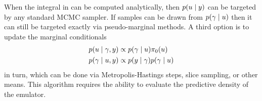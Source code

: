 \documentclass[12pt]{article}
\begin{document}
When the integral in  can be computed analytically, then $p(u \mid y)$ can 
be targeted by any standard MCMC sampler. If samples can be drawn from $p(\gamma \mid u)$ then
it can still be targeted exactly via pseudo-marginal methods. A third option is to update the marginal conditionals
\begin{align}
p(u \mid \gamma, y) &\propto p(\gamma \mid u) \pi_0(u) \label{eq:EL-conditionals} \\
p(\gamma \mid u, y) &\propto p(y \mid \gamma) p(\gamma \mid u)
\end{align}
in turn, which can be done via Metropolis-Hastings steps, slice sampling, or other means. This algorithm
requires the ability to evaluate the predictive density of the emulator.
\end{document}
